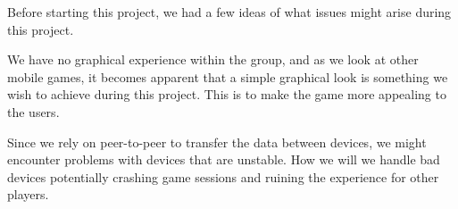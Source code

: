 Before starting this project, we had a few ideas of what issues might arise during this project.

We have no graphical experience within the group, and as we look at other mobile games, it becomes apparent that a simple graphical look is something we wish to achieve during this project. This is to make the game more appealing to the users.

Since we rely on peer-to-peer to transfer the data between devices, we might encounter problems with devices that are unstable. How we will we handle bad devices potentially crashing game sessions and ruining the experience for other players.
